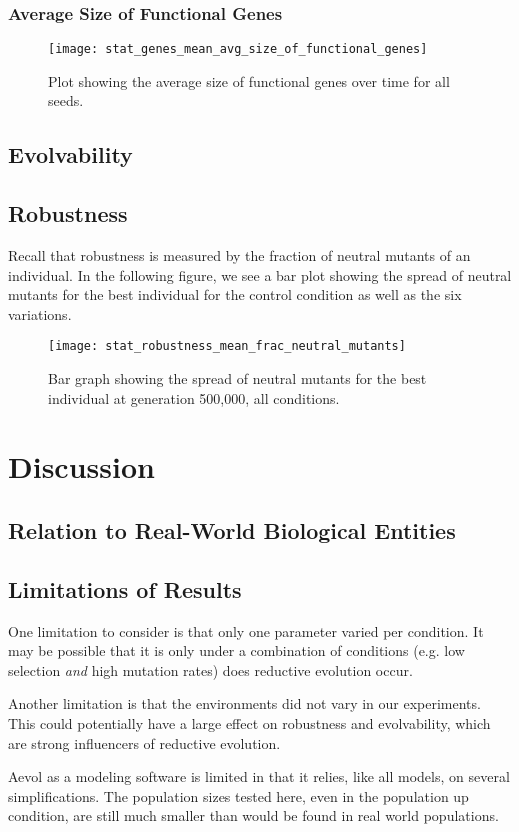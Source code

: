 \subsubsection{Average Size of Functional Genes}
\begin{figure}[H]
	\centering
	\texttt{[image: stat\_genes\_mean\_avg\_size\_of\_functional\_genes]}
	\caption[Average size of functional genes]{Plot showing the average size of functional genes over time for all seeds.}
	\label{fig:mean_functional_gene_size}
\end{figure}

\subsection{Evolvability}

\subsection{Robustness}
Recall that robustness is measured by the fraction of neutral mutants of an individual. In the following figure, we see a bar plot showing the spread of neutral mutants for the best individual for the control condition as well as the six variations. 

\begin{figure}[H]
	\centering
	\texttt{[image: stat\_robustness\_mean\_frac\_neutral\_mutants]}
	\caption[Robustness bar graph]{Bar graph showing the spread of neutral mutants for the best individual at generation 500,000, all conditions.}
	\label{fig:mean_robustness_all_conditions}
\end{figure}

\section{Discussion}\label{discussion}

\subsection{Relation to Real-World Biological Entities}
\subsection{Limitations of Results}\label{limitations}
One limitation to consider is that only one parameter varied per condition. It may be possible that it is only under a combination of conditions (e.g. low selection \textit{and} high mutation rates) does reductive evolution occur. 

Another limitation is that the environments did not vary in our experiments. This could potentially have a large effect on robustness and evolvability, which are strong influencers of reductive evolution. 

Aevol as a modeling software is limited in that it relies, like all models, on several simplifications. The population sizes tested here, even in the population up condition, are still much smaller than would be found in real world populations. 